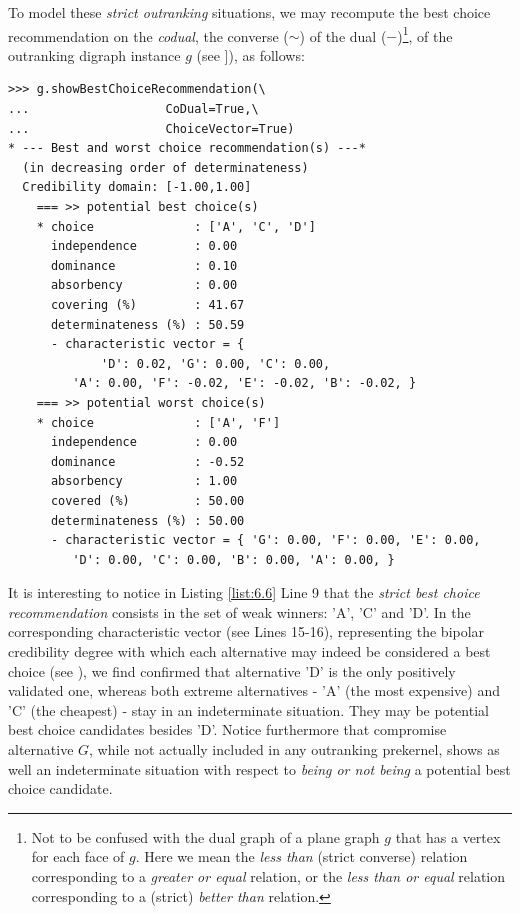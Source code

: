 To model these \emph{strict outranking} situations, we may recompute the best choice recommendation on the \emph{codual}, the converse ($\sim$) of the dual ($-$)\footnote{Not to be confused with the dual graph of a plane graph $g$ that has a vertex for each face of $g$. Here we mean the \emph{less than} (strict converse) relation corresponding to a \emph{greater or equal} relation, or the \emph{less than or equal} relation corresponding to a (strict) \emph{better than} relation.}, of the outranking digraph instance $g$ (see \citet{BIS-2013}]), as follows:
\begin{lstlisting}[caption={Computing the strict best choice recommendation},label=list:6.6]
>>> g.showBestChoiceRecommendation(\
...                   CoDual=True,\
...                   ChoiceVector=True)   
* --- Best and worst choice recommendation(s) ---*
  (in decreasing order of determinateness)   
  Credibility domain: [-1.00,1.00]
    === >> potential best choice(s)
    * choice              : ['A', 'C', 'D']
      independence        : 0.00
      dominance           : 0.10
      absorbency          : 0.00
      covering (%)        : 41.67
      determinateness (%) : 50.59
      - characteristic vector = {
             'D': 0.02, 'G': 0.00, 'C': 0.00,
	     'A': 0.00, 'F': -0.02, 'E': -0.02, 'B': -0.02, }
    === >> potential worst choice(s) 
    * choice              : ['A', 'F']
      independence        : 0.00
      dominance           : -0.52
      absorbency          : 1.00
      covered (%)         : 50.00
      determinateness (%) : 50.00
      - characteristic vector = { 'G': 0.00, 'F': 0.00, 'E': 0.00,
	     'D': 0.00, 'C': 0.00, 'B': 0.00, 'A': 0.00, }
\end{lstlisting}				  

It is interesting to notice in Listing \ref{list:6.6} Line 9 that the \emph{strict best choice recommendation} consists in the set of weak \Condorcet winners: 'A', 'C' and 'D'. In the corresponding characteristic vector (see Lines 15-16), representing the bipolar credibility degree with which each alternative may indeed be considered a best choice (see \citet{BIS-2006a,BIS-2006b}), we find confirmed that alternative 'D' is the only positively validated one, whereas both extreme alternatives - 'A' (the most expensive) and 'C' (the cheapest) - stay in an indeterminate situation. They may be potential best choice candidates besides 'D'. Notice furthermore that compromise alternative $G$, while not actually included in any outranking prekernel, shows as well an indeterminate situation with respect to \emph{being or not being} a potential best choice candidate. 

